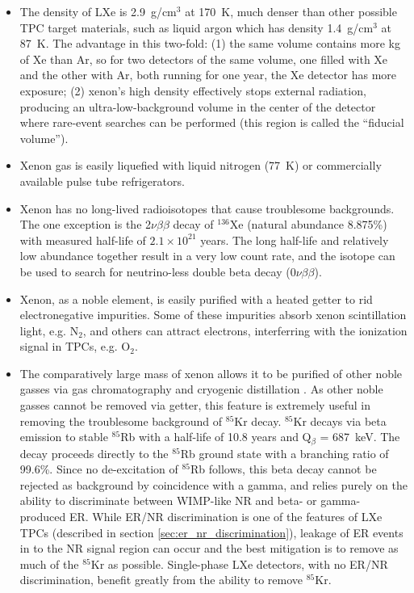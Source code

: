 \begin{itemize}
  \item The density of \ac{LXe} is 2.9~g/cm$^{3}$ at 170~K, much denser than other possible \ac{TPC} target materials, such as liquid argon which has density 1.4~g/cm$^{3}$ at 87~K. The advantage in this two-fold: (1) the same volume contains more kg of Xe than Ar, so for two detectors of the same volume, one filled with Xe and the other with Ar, both running for one year, the Xe detector has more exposure; (2) xenon's high density effectively stops external radiation, producing an ultra-low-background volume in the center of the detector where rare-event searches can be performed (this region is called the ``fiducial volume'').
  
  \item Xenon gas is easily liquefied with liquid nitrogen (77~K) or commercially available pulse tube refrigerators.

  \item Xenon has no long-lived radioisotopes that cause troublesome backgrounds. The one exception is the 2$\nu\beta\beta$ decay of $^{136}$Xe (natural abundance 8.875\%) with measured half-life of $2.1 \times 10^{21}$ years. The long half-life and relatively low abundance together result in a very low count rate, and the isotope can be used to search for neutrino-less double beta decay ($0\nu\beta\beta$).
  
  \item Xenon, as a noble element, is easily purified with a heated getter to rid electronegative impurities. Some of these impurities absorb xenon scintillation light, e.g. N$_{2}$, and others can attract electrons, interferring with the ionization signal in \ac{TPC}s, e.g. O$_{2}$.
  
  \item The comparatively large mass of xenon allows it to be purified of other noble gasses via gas chromatography \cite{LUXKrRemoval2018} and cryogenic distillation \cite{Xe1TKrRemoval2017}. As other noble gasses cannot be removed via getter, this feature is extremely useful in removing the troublesome background of $^{85}$Kr decay. $^{85}$Kr decays via beta emission to stable $^{85}$Rb with a half-life of 10.8 years and Q$_{\beta}$ = 687~keV. The decay proceeds directly to the $^{85}$Rb ground state with a branching ratio of 99.6\%. Since no de-excitation of $^{85}$Rb follows, this beta decay cannot be rejected as background by coincidence with a gamma, and relies purely on the ability to discriminate between WIMP-like \ac{NR} and beta- or gamma- produced \ac{ER}. While ER/NR discrimination is one of the features of \ac{LXe} \ac{TPC}s (described in section \ref{sec:er_nr_discrimination}), leakage of \ac{ER} events in to the \ac{NR} signal region can occur and the best mitigation is to remove as much of the  $^{85}$Kr as possible. Single-phase \ac{LXe} detectors, with no ER/NR discrimination, benefit greatly from the ability to remove $^{85}$Kr.
  

\end{itemize}
